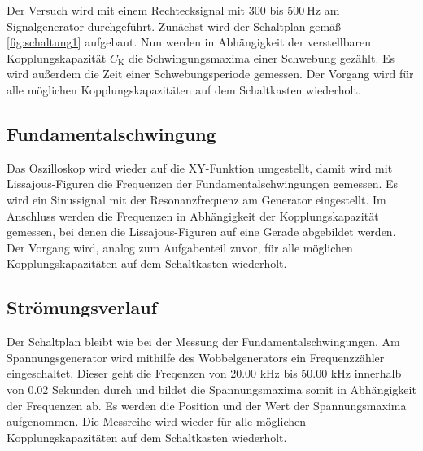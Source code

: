 \noindent Der Versuch wird mit einem Rechtecksignal mit $300$ bis $500 \:\si{\hertz}$ am Signalgenerator durchgeführt.
Zunächst wird der Schaltplan gemäß \autoref{fig:schaltung1} aufgebaut. Nun werden in Abhängigkeit der verstellbaren Kopplungskapazität $C_{\text{K}}$ die 
Schwingungsmaxima einer Schwebung gezählt. Es wird außerdem die Zeit einer Schwebungsperiode gemessen.
Der Vorgang wird für alle möglichen Kopplungskapazitäten auf dem Schaltkasten wiederholt.

\subsection{Fundamentalschwingung}
Das Oszilloskop wird wieder auf die XY-Funktion umgestellt, damit wird mit Lissajous-Figuren die Frequenzen der Fundamentalschwingungen gemessen. 
Es wird ein Sinussignal mit der Resonanzfrequenz am Generator eingestellt. Im Anschluss werden die Frequenzen in Abhängigkeit der Kopplungskapazität 
gemessen, bei denen die Lissajous-Figuren auf eine Gerade abgebildet werden. Der Vorgang wird, analog zum Aufgabenteil zuvor, für alle möglichen 
Kopplungskapazitäten auf dem Schaltkasten wiederholt. 

\subsection{Strömungsverlauf}
Der Schaltplan bleibt wie bei der Messung der Fundamentalschwingungen. Am Spannungsgenerator wird mithilfe des Wobbelgenerators ein Frequenzzähler
eingeschaltet. Dieser geht die Freqenzen von 20.00 kHz bis 50.00 kHz innerhalb von 0.02 Sekunden durch und bildet die Spannungsmaxima somit in
Abhängigkeit der Frequenzen ab. Es werden die Position und der Wert der Spannungsmaxima aufgenommen. Die Messreihe wird wieder für alle
möglichen Kopplungskapazitäten auf dem Schaltkasten wiederholt.